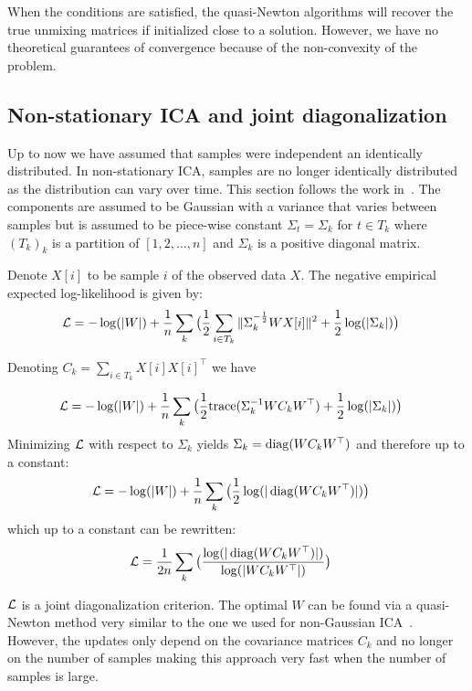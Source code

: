 When the conditions are satisfied, the quasi-Newton algorithms will recover the
true unmixing matrices if initialized close to a solution. However, we have no
theoretical guarantees of convergence because of the non-convexity of the problem.

\subsection{Non-stationary ICA and joint diagonalization}
Up to now we have assumed that samples were independent an identically distributed. In non-stationary ICA, samples are no longer identically distributed as the distribution can vary over time.
This section follows the work in~\cite{pham2001blind}.
The components are assumed to be Gaussian with a variance that varies between
samples but is assumed to be piece-wise constant $\Sigma_t = \Sigma_k$ for $t \in
T_k$ where $(T_k)_k$ is a partition of $[1, 2, \dots, n]$ and $\Sigma_k$ is a
positive diagonal matrix.

Denote $X[i]$ to be sample $i$ of the observed data $X$.
The negative empirical expected log-likelihood is given by:
\begin{align}  
  \mathcal{L} &= -\log(|W|)  + \frac1{n} \sum_k \big( \frac12 \sum_{i \in T_k}\|\Sigma_k^{-\frac12} W X[i] \|^2 + \frac12 \log(|\Sigma_k|) \big)
\end{align}

Denoting $C_k = \sum_{i \in T_k} X[i] X[i]^{\top}$ we have 

\begin{align}  
  \mathcal{L} &= -\log(|W|)  + \frac1{n} \sum_k \big( \frac1{2} {\mathrm{ trace}}(\Sigma_k^{-1} W C_k W^{\top}) + \frac12 \log(|\Sigma_k|) \big)
\end{align}
Minimizing $\mathcal{L}$ with respect to $\Sigma_k$ yields $\Sigma_k = \operatorname*{diag}(W C_k
W^{\top})$ and therefore up to a constant:
\begin{align}  
  \mathcal{L} &= -\log(|W|)  + \frac1{n} \sum_k \big(\frac12 \log(|\operatorname*{diag}(W C_k W^{\top})|) \big)
\end{align}
which up to a constant can be rewritten:
\begin{align}  
  \mathcal{L} &=\frac1{2n} \sum_k \big(\frac{\log(|\operatorname*{diag}(W C_k W^{\top})|)}{\log(|W C_k W^{\top}|)} \big) \label{jointdiagcritica}
\end{align}

$\mathcal{L}$ is a joint diagonalization criterion. The optimal $W$ can be found via a
quasi-Newton method very similar to the one we used for non-Gaussian
ICA~\cite{ablin2018beyond}. However, the updates only depend on the covariance
matrices $C_k$ and no longer on the number of samples making this approach very
fast when the number of samples is large.


